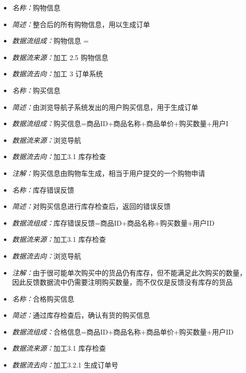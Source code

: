 \vspace{-1mm}

\begin{itemize}
	\item \textit{名称：}购物信息
	\item \textit{简述：}整合后的所有购物信息，用以生成订单
	\item \textit{数据流组成：}购物信息 =
	\item \textit{数据流来源：}加工 2.5 购物信息
	\item \textit{数据流去向：}加工 3 订单系统
\end{itemize}

\vspace{-1mm}

\begin{itemize}
	\item \textit{名称：}购买信息
	\item \textit{简述：}由浏览导航子系统发出的用户购买信息，用于生成订单
	\item \textit{数据流组成：}购买信息=商品ID+商品名称+商品单价+购买数量+用户I
	\item \textit{数据流来源：}浏览导航
	\item \textit{数据流去向：}加工3.1 库存检查
	\item \textit{注解：}购买信息由购物车生成，相当于用户提交的一个购物申请
\end{itemize}

\vspace{-1mm}

\begin{itemize}
	\item \textit{名称：}库存错误反馈
	\item \textit{简述：}对购买信息进行库存检查后，返回的错误反馈
	\item \textit{数据流组成：}库存错误反馈=商品ID+商品名称+购买数量+用户ID
	\item \textit{数据流来源：}加工3.1 库存检查
	\item \textit{数据流去向：}浏览导航
	\item \textit{注解：}由于很可能单次购买中的货品仍有库存，但不能满足此次购买的数量，因此反馈数据流中仍需要注明购买数量，而不仅仅是反馈没有库存的货品
\end{itemize}

\vspace{-1mm}

\begin{itemize}
	\item \textit{名称：}合格购买信息
	\item \textit{简述：}通过库存检查后，确认有货的购买信息
	\item \textit{数据流组成：}合格信息=商品ID+商品名称+商品单价+购买数量+用户ID
	\item \textit{数据流来源：}加工3.1 库存检查
	\item \textit{数据流去向：}加工3.2.1 生成订单号
\end{itemize}

